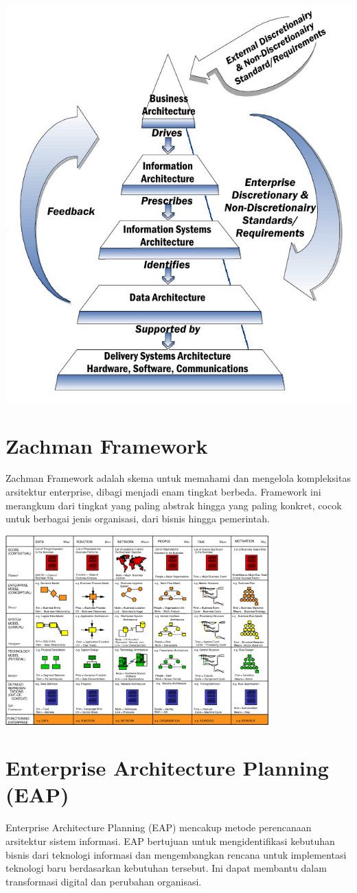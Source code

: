 \begin{center}
	\includegraphics[width=.40\textwidth]{../figures/nist}
\end{center}

\section{Zachman Framework}
Zachman Framework adalah skema untuk memahami dan mengelola kompleksitas arsitektur enterprise, dibagi menjadi enam tingkat berbeda. Framework ini merangkum dari tingkat yang paling abstrak hingga yang paling konkret, cocok untuk berbagai jenis organisasi, dari bisnis hingga pemerintah.

\begin{center}
	\includegraphics[width=0.76\textwidth]{../figures/zachman}
\end{center}

\section{Enterprise Architecture Planning (EAP)}
Enterprise Architecture Planning (EAP) mencakup metode perencanaan arsitektur sistem informasi. EAP bertujuan untuk mengidentifikasi kebutuhan bisnis dari teknologi informasi dan mengembangkan rencana untuk implementasi teknologi baru berdasarkan kebutuhan tersebut. Ini dapat membantu dalam transformasi digital dan perubahan organisasi.

